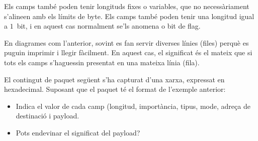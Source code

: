 \begin{remark}
Els camps també poden tenir longituds fixes o variables, que no necessàriament s'alineen amb els 
límits de byte. Els camps també poden tenir una longitud igual a $1$~bit,
i en aquest cas normalment se'ls anomena  o bit de flag.
\end{remark}


\begin{remark}
En diagrames com l'anterior, sovint es fan servir diverses línies (files) perquè es puguin
imprimir i llegir fàcilment. En aquest cas, el significat és el mateix que si tots els camps s'haguessin
presentat en una mateixa línia (fila).
\end{remark}

\begin{exercise}
El contingut de paquet següent s'ha capturat d'una xarxa,
expressat en hexadecimal. Suposant que el paquet té el format de l'exemple anterior:
% 
\begin{itemize}
\item Indica el valor de cada camp (longitud, importància, tipus, mode, adreça de destinació i payload.
\item Pots endevinar el significat del payload?
\end{itemize}
% 
\begin{center}
\end{center}
\end{exercise}

